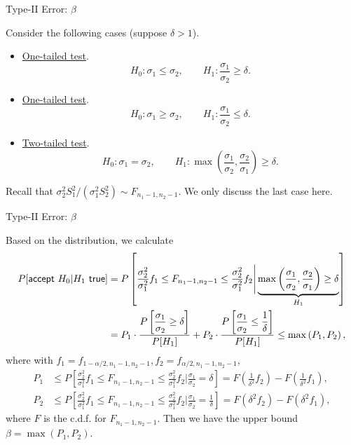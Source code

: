 \begin{frame}{Type-II Error: $\beta$}

\justifying
{} Consider the following cases (suppose $\delta > 1$).
\begin{itemize}
	\item \underline{One-tailed test}. $$H_0: \sigma_1 \leq \sigma_2,\qquad H_1: \frac{\sigma_1}{\sigma_2} \geq \delta.$$
	\item \underline{One-tailed test}. $$H_0: \sigma_1 \geq \sigma_2,\qquad H_1: \frac{\sigma_1}{\sigma_2} \leq \delta.$$
	\item \underline{Two-tailed test}. $$H_0: \sigma_1 = \sigma_2,\qquad H_1: \max\left(\frac{\sigma_1}{\sigma_2}, \frac{\sigma_2}{\sigma_1}\right) \geq \delta.$$
\end{itemize}
Recall that $\sigma_2^2S_1^2/(\sigma_1^2S_2^2) \sim F_{n_1-1,n_2-1}$. We only discuss the last case here.

\end{frame}


\begin{frame}{Type-II Error: $\beta$}

\justifying
{} Based on the distribution, we calculate
\footnotesize
\begin{align*}
P[\mathsf{accept\ } H_0|H_1 \mathsf{\ true}] & = P\left[\frac{\sigma_2^2}{\sigma_1^2}f_1 \leq F_{n_1-1,n_2-1} \leq \frac{\sigma_2^2}{\sigma_1^2}f_2\Bigg|\underbrace{\max\left(\frac{\sigma_1}{\sigma_2}, \frac{\sigma_2}{\sigma_1}\right) \geq \delta}_{H_1} \right] \\
& = P_1\cdot \frac{P\left[\dfrac{\sigma_1}{\sigma_2} \geq \delta \right]}{P[H_1]} + P_2\cdot \frac{P\left[\dfrac{\sigma_1}{\sigma_2} \leq \dfrac{1}{\delta} \right]}{P[H_1]} \leq \max\left(P_1, P_2 \right),
\end{align*}
\normalsize
where with $f_1 = f_{1-\alpha/2,n_1-1,n_2-1}, f_2 = f_{\alpha/2,n_1-1,n_2-1}$,
\footnotesize
\begin{align*}
P_1 & \leq P\left[\frac{\sigma_2^2}{\sigma_1^2}f_1 \leq F_{n_1-1,n_2-1} \leq \frac{\sigma_2^2}{\sigma_1^2}f_2\Bigg|\frac{\sigma_1}{\sigma_2} = \delta \right] = F\left(\frac{1}{\delta^2} f_2 \right) - F\left(\frac{1}{\delta^2} f_1 \right), \\
P_2 & \leq P\left[\frac{\sigma_2^2}{\sigma_1^2}f_1 \leq F_{n_1-1,n_2-1} \leq \frac{\sigma_2^2}{\sigma_1^2}f_2\Bigg|\frac{\sigma_1}{\sigma_2} = \frac{1}{\delta} \right] = F\left(\delta^2 f_2 \right) - F\left(\delta^2 f_1 \right),
\end{align*}
\normalsize
where $F$ is the c.d.f. for $F_{n_1-1,n_2-1}$. Then we have the upper bound $\beta = \max(P_1, P_2)$.

\end{frame}



